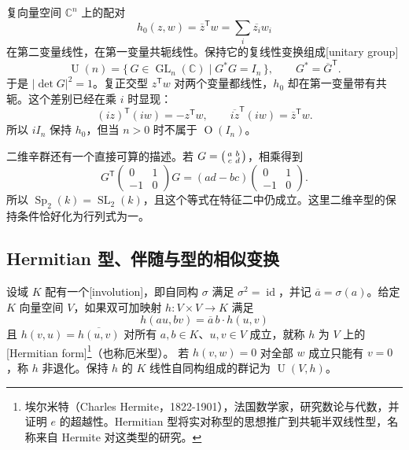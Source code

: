 \ProseParagraphBreak
复向量空间 \(\mathbb C^n\) 上的配对
\[
	h_0(z,w)=\overline z^{\mathsf T}w=\sum_i\overline{z_i}w_i
\]
在第二变量线性，在第一变量共轭线性。保持它的复线性变换组成[unitary group]
\[
	\operatorname U(n)=\{\,G\in\operatorname{GL}_n(\mathbb C)\mid G^*G=I_n\,\}, \qquad G^*=\overline G^{\mathsf T}.
\]
于是 \(|\det G|^2=1\)。复正交型 \(z^{\mathsf T}w\) 对两个变量都线性，\(h_0\) 却在第一变量带有共轭。这个差别已经在乘 \(i\) 时显现：
\[
	(iz)^{\mathsf T}(iw)=-z^{\mathsf T}w,\qquad \overline{iz}^{\mathsf T}(iw)=\overline z^{\mathsf T}w.
\]
所以 \(iI_n\) 保持 \(h_0\)，但当 \(n>0\) 时不属于 \(\operatorname O(I_n)\)。

\ProseParagraphBreak
二维辛群还有一个直接可算的描述。若 \(G=\begin{psmallmatrix}a&b\\c&d\end{psmallmatrix}\)，相乘得到
\[
	G^{\mathsf T}\begin{pmatrix}0&1\\-1&0\end{pmatrix}G
	=(ad-bc)\begin{pmatrix}0&1\\-1&0\end{pmatrix}.
\]
所以 \(\operatorname{Sp}_2(k)=\operatorname{SL}_2(k)\)，且这个等式在特征二中仍成立。这里二维辛型的保持条件恰好化为行列式为一。

\subsection{Hermitian 型、伴随与型的相似变换}
\label{b2:subsec:1004:02}

\begin{definition}\label{b2:def:hermitian-form}
	设域 \(K\) 配有一个[involution]，即自同构 \(\sigma\) 满足 \(\sigma^2=\operatorname{id}\)，并记 \(\overline a=\sigma(a)\)。给定 \(K\) 向量空间 \(V\)，如果双可加映射 \(h:V\times V\to K\) 满足
	\[
		h(au,bv)=\overline a\,b\cdot h(u,v)
	\]
	且 \(h(v,u)=\overline{h(u,v)}\) 对所有 \(a,b\in K\)、\(u,v\in V\) 成立，就称 \(h\) 为 \(V\) 上的[Hermitian form]\footnote{埃尔米特（Charles Hermite，1822-1901），法国数学家，研究数论与代数，并证明 \(e\) 的超越性。Hermitian 型将实对称型的思想推广到共轭半双线性型，名称来自 Hermite 对这类型的研究。}（也称厄米型）。
	若 \(h(v,w)=0\) 对全部 \(w\) 成立只能有 \(v=0\)，称 \(h\) 非退化。保持 \(h\) 的 \(K\) 线性自同构组成的群记为 \(\operatorname U(V,h)\)。
\end{definition}


